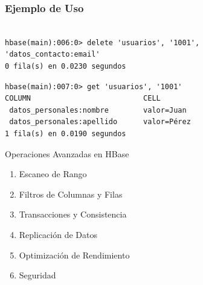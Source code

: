 \begin{frame}[fragile]
\frametitle{Ejemplo de Uso}
\begin{verbatim}

hbase(main):006:0> delete 'usuarios', '1001', 
'datos_contacto:email'
0 fila(s) en 0.0230 segundos
\end{verbatim}
  
\begin{verbatim}
hbase(main):007:0> get 'usuarios', '1001'
COLUMN                          CELL
 datos_personales:nombre        valor=Juan
 datos_personales:apellido      valor=Pérez
1 fila(s) en 0.0190 segundos
\end{verbatim}

\end{frame}

\begin{frame}{Operaciones Avanzadas en HBase}
    \begin{enumerate}
        \item Escaneo de Rango  
        \item Filtros de Columnas y Filas  
        \item Transacciones y Consistencia  
        \item Replicación de Datos  
        \item Optimización de Rendimiento  
        \item Seguridad
    \end{enumerate}
\end{frame}